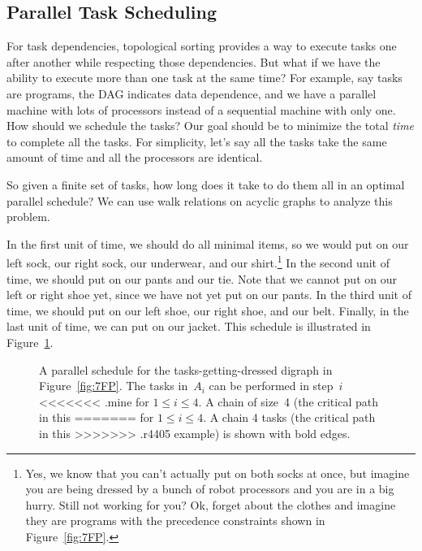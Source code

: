 \subsection{Parallel Task Scheduling}\label{parallel_sec}

For task dependencies, topological sorting provides a
way to execute tasks one after another while respecting those dependencies.
But what if we have the ability to execute more than one task at the same
time?  For example, say tasks are programs, the DAG indicates
data dependence, and we have a parallel machine with lots of processors
instead of a sequential machine with only one.  How should we schedule the
tasks?  Our goal should be to minimize the total \emph{time} to complete
all the tasks.  For simplicity, let's say all the tasks take the same
amount of time and all the processors are identical.

So given a finite set of tasks, how long does it take to do them all
in an optimal parallel schedule?  We can use walk relations on
acyclic graphs to analyze this problem.

In the first unit of time, we should do all minimal items, so we would
put on our left sock, our right sock, our underwear, and our
shirt.\footnote{Yes, we know that you can't actually put on both socks
  at once, but imagine you are being dressed by a bunch of robot
  processors and you are in a big hurry.  Still not working for you?
  Ok, forget about the clothes and imagine they are programs with the
  precedence constraints shown in Figure~\ref{fig:7FP}.}  In the
second unit of time, we should put on our pants and our tie.  Note
that we cannot put on our left or right shoe yet, since we have not
yet put on our pants.  In the third unit of time, we should put on our
left shoe, our right shoe, and our belt.  Finally, in the last unit of
time, we can put on our jacket.  This schedule is illustrated in
Figure~\ref{fig:7FS}.

\begin{figure}


\caption{A parallel schedule for the tasks-getting-dressed digraph in
Figure~\ref{fig:7FP}.  The tasks in~$A_i$ can be performed in step~$i$
<<<<<<< .mine
for $1 \le i \le 4$.  A chain of size~4 (the critical path in this
=======
for $1 \le i \le 4$.  A chain 4 tasks (the critical path in this
>>>>>>> .r4405
example) is shown with bold edges.}

\label{fig:7FS}

\end{figure}

